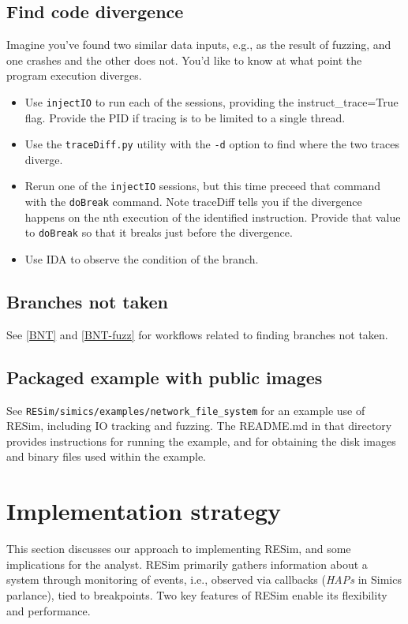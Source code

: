 \documentclass[titlepage]{article}
\begin{document}
\subsection{Find code divergence}
Imagine you've found two similar data inputs, e.g., as the result of fuzzing, and one
crashes and the other does not.  You'd like to know at what point the program execution diverges.
\begin{itemize}
\item Use {\tt injectIO} to run each of the sessions, providing the instruct\_trace=True flag.  Provide the PID if
tracing is to be limited to a single thread.
\item Use the {\tt traceDiff.py} utility with the {\tt -d} option to find where the two traces diverge.
\item Rerun one of the {\tt injectIO} sessions, but this time preceed that command with the {\tt doBreak} command.
Note traceDiff tells you if the divergence happens on the nth execution of the identified instruction.  Provide that
value to {\tt doBreak} so that it breaks just before the divergence.
\item Use IDA to observe the condition of the branch.
\end{itemize}

\subsection{Branches not taken}
See \ref{BNT} and \ref{BNT-fuzz} for workflows related to finding branches not taken.

\subsection{Packaged example with public images}
See {\tt RESim/simics/examples/network\_file\_system} for an example use of RESim, including IO tracking and fuzzing.
The README.md in that directory provides instructions for running the example, and for obtaining the disk images
and binary files used within the example.

\section{Implementation strategy}
\label{implementation}
This section discusses our approach to implementing RESim, and some implications for the analyst.
RESim primarily gathers information about a system through monitoring of events, i.e., observed via callbacks (\textit{HAPs} in Simics parlance), tied to 
breakpoints.  Two key features of RESim enable its flexibility and performance.  
\end{document}

